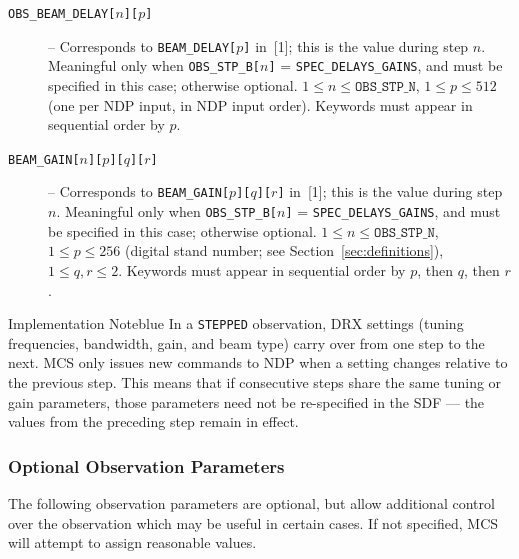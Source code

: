 \begin{description}
\item[\texttt{OBS\_BEAM\_DELAY[$n$][$p$]}] -- Corresponds to \texttt{BEAM\_DELAY[$p$]} in~[1]; this is the value during step $n$.  Meaningful only when \texttt{OBS\_STP\_B[$n$]} = \texttt{SPEC\_DELAYS\_GAINS}, and must be specified in this case; otherwise optional.  $1 \le n \le \texttt{OBS\_STP\_N}$, $1 \le p \le 512$ (one per NDP input, in NDP input order).  Keywords must appear in sequential order by $p$.

\item[\texttt{BEAM\_GAIN[$n$][$p$][$q$][$r$]}] -- Corresponds to \texttt{BEAM\_GAIN[$p$][$q$][$r$]} in~[1]; this is the value during step $n$.  Meaningful only when \texttt{OBS\_STP\_B[$n$]} = \texttt{SPEC\_DELAYS\_GAINS}, and must be specified in this case; otherwise optional.  $1 \le n \le \texttt{OBS\_STP\_N}$, $1 \le p \le 256$ (digital stand number; see Section~\ref{sec:definitions}), $1 \le q, r \le 2$.  Keywords must appear in sequential order by $p$, then $q$, then $r$.
\end{description}

\begin{calloutBox}{Implementation Note}{blue}
In a \texttt{STEPPED} observation, DRX settings (tuning frequencies, bandwidth, gain, and beam type) carry over from one step to the next.  MCS only issues new commands to NDP when a setting changes relative to the previous step.  This means that if consecutive steps share the same tuning or gain parameters, those parameters need not be re-specified in the SDF --- the values from the preceding step remain in effect.
\end{calloutBox}

\subsubsection{Optional Observation Parameters}

The following observation parameters are optional, but allow additional control over the observation which may be useful in certain cases.  If not specified, MCS will attempt to assign reasonable values.

